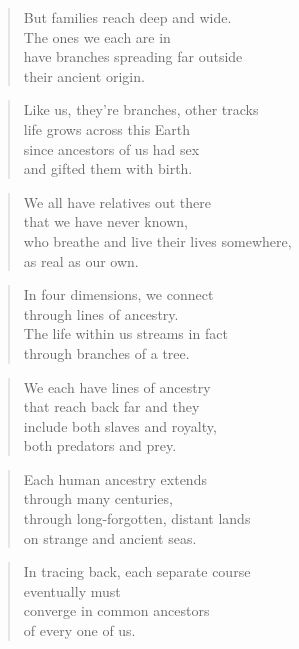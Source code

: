 \documentclass[10pt,a4paper]{article}
\begin{document}
\begin{multicols}{2}
\begin{verse}
But families reach deep and wide.\\
The ones we each are in\\
have branches spreading far outside\\
their ancient origin.
\end{verse}

\begin{verse}
Like us, they’re branches, other tracks\\
life grows across this Earth\\
since ancestors of us had sex\\
and gifted them with birth.
\end{verse}

\begin{verse}
We all have relatives out there\\
that we have never known,\\
who breathe and live their lives somewhere,\\
as real as our own.
\end{verse}

\begin{verse}
In four dimensions, we connect\\
through lines of ancestry.\\
The life within us streams in fact\\
through branches of a tree.
\end{verse}

\begin{verse}
We each have lines of ancestry\\
that reach back far and they\\
include both slaves and royalty,\\
both predators and prey.
\end{verse}

\begin{verse}
Each human ancestry extends\\
through many centuries,\\
through long-forgotten, distant lands\\
on strange and ancient seas.
\end{verse}

\begin{verse}
In tracing back, each separate course\\
eventually must\\
converge in common ancestors\\
of every one of us.
\end{verse}


\end{multicols}
\end{document}
